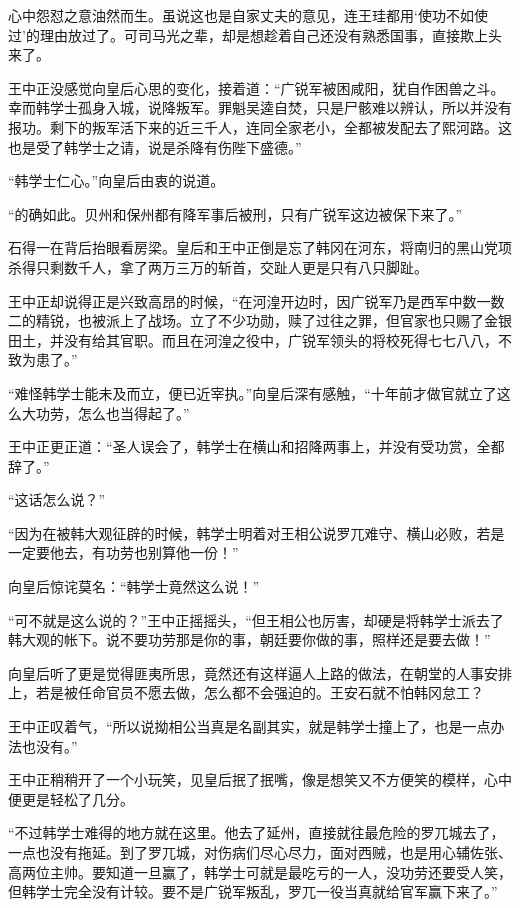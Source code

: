 心中怨怼之意油然而生。虽说这也是自家丈夫的意见，连王珪都用‘使功不如使过’的理由放过了。可司马光之辈，却是想趁着自己还没有熟悉国事，直接欺上头来了。

王中正没感觉向皇后心思的变化，接着道：“广锐军被困咸阳，犹自作困兽之斗。幸而韩学士孤身入城，说降叛军。罪魁吴逵自焚，只是尸骸难以辨认，所以并没有报功。剩下的叛军活下来的近三千人，连同全家老小，全都被发配去了熙河路。这也是受了韩学士之请，说是杀降有伤陛下盛德。”

“韩学士仁心。”向皇后由衷的说道。

“的确如此。贝州和保州都有降军事后被刑，只有广锐军这边被保下来了。”

石得一在背后抬眼看房梁。皇后和王中正倒是忘了韩冈在河东，将南归的黑山党项杀得只剩数千人，拿了两万三万的斩首，交趾人更是只有八只脚趾。

王中正却说得正是兴致高昂的时候，“在河湟开边时，因广锐军乃是西军中数一数二的精锐，也被派上了战场。立了不少功勋，赎了过往之罪，但官家也只赐了金银田土，并没有给其官职。而且在河湟之役中，广锐军领头的将校死得七七八八，不致为患了。”

“难怪韩学士能未及而立，便已近宰执。”向皇后深有感触，“十年前才做官就立了这么大功劳，怎么也当得起了。”

王中正更正道：“圣人误会了，韩学士在横山和招降两事上，并没有受功赏，全都辞了。”

“这话怎么说？”

“因为在被韩大观征辟的时候，韩学士明着对王相公说罗兀难守、横山必败，若是一定要他去，有功劳也别算他一份！”

向皇后惊诧莫名：“韩学士竟然这么说！”

“可不就是这么说的？”王中正摇摇头，“但王相公也厉害，却硬是将韩学士派去了韩大观的帐下。说不要功劳那是你的事，朝廷要你做的事，照样还是要去做！”

向皇后听了更是觉得匪夷所思，竟然还有这样逼人上路的做法，在朝堂的人事安排上，若是被任命官员不愿去做，怎么都不会强迫的。王安石就不怕韩冈怠工？

王中正叹着气，“所以说拗相公当真是名副其实，就是韩学士撞上了，也是一点办法也没有。”

王中正稍稍开了一个小玩笑，见皇后抿了抿嘴，像是想笑又不方便笑的模样，心中便更是轻松了几分。

“不过韩学士难得的地方就在这里。他去了延州，直接就往最危险的罗兀城去了，一点也没有拖延。到了罗兀城，对伤病们尽心尽力，面对西贼，也是用心辅佐张、高两位主帅。要知道一旦赢了，韩学士可就是最吃亏的一人，没功劳还要受人笑，但韩学士完全没有计较。要不是广锐军叛乱，罗兀一役当真就给官军赢下来了。”

